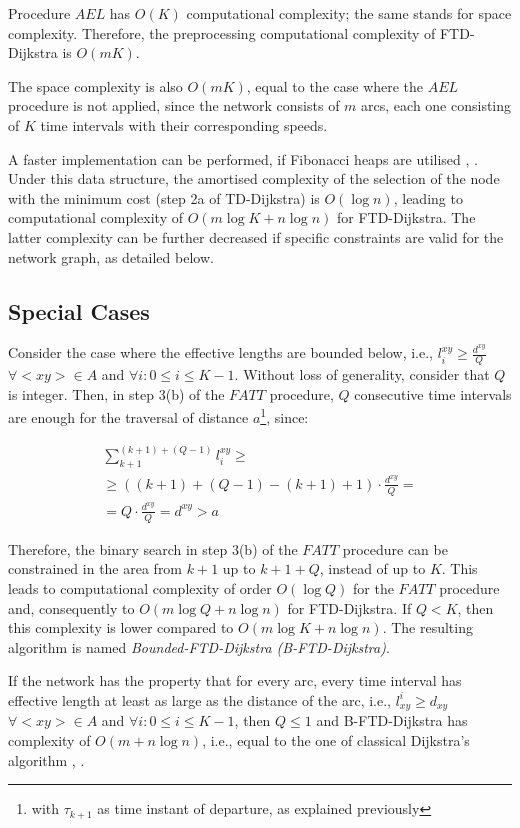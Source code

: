 \documentclass[conference]{IEEEtran}
\begin{document}
Procedure $AEL$ has $O(K)$ computational complexity; the same stands for space complexity. Therefore, the preprocessing computational complexity of FTD-Dijkstra is $O(mK)$. 

The space complexity is also $O(mK)$, equal to the case where the $AEL$ procedure is not applied, since the network consists of $m$ arcs, each one consisting of $K$ time intervals with their corresponding speeds. 


A faster implementation can be performed, if Fibonacci heaps are utilised \cite{fibonacci}, \cite{ahuja}. Under this data structure, the amortised complexity of the selection of the node with the minimum cost (step 2a of TD-Dijkstra) is $O(\log n)$, leading to computational complexity of $O(m\log K + n\log n)$ for FTD-Dijkstra. The latter complexity can be further decreased if specific constraints are valid for the network graph, as detailed below.


\subsection{Special Cases}

Consider the case where the effective lengths are bounded below, i.e., $l_i^{xy}\geq \frac{d^{xy}}{Q}$ $\forall <xy>\in A$ and $\forall i: 0\leq i\leq K-1$. Without loss of generality, consider that $Q$ is integer. Then, in step 3(b) of the $FATT$ procedure, $Q$ consecutive time intervals are enough for the traversal of distance $a$\footnote{with $\tau_{k+1}$ as time instant of departure, as explained previously}, since:

\begin{eqnarray}
     &\sum_{k+1}^{(k+1)+(Q-1)}l_{i}^{xy}\geq\nonumber\\ 
     &\geq ((k+1)+(Q-1)-(k+1)+1)\cdot\frac{d^{xy}}{Q}=&\nonumber\\
     &=Q\cdot\frac{d^{xy}}{Q}=d^{xy}>a& 
\end{eqnarray}

Therefore, the binary search in step 3(b) of the $FATT$ procedure can be constrained in the area from $k+1$ up to $k+1+Q$, instead of up to $K$. This leads to computational complexity of order $O(\log Q)$ for the $FATT$ procedure and, consequently to  $O(m\log Q + n\log n)$ for FTD-Dijkstra. If $Q<K$, then this complexity is lower compared to $O(m\log K + n\log n)$. The resulting algorithm is named \emph{Bounded-FTD-Dijkstra (B-FTD-Dijkstra)}.

If the network has the property that for every arc, every time interval has effective length at least as large as the distance of the arc, i.e., $l^i_{xy}\geq d_{xy}$ $\forall <xy>\in A$ and $\forall i: 0\leq i\leq K-1$, then $Q\leq 1$ and B-FTD-Dijkstra has complexity of $O(m + n\log n)$, i.e., equal to the one of classical Dijkstra's algorithm \cite{dijkstra}, \cite{fibonacci}.
\end{document}
